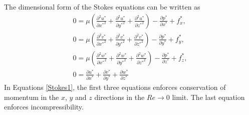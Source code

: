 \documentclass[10pt,a4paper]{article}
\def\non{\nonumber}
\def\p{\partial}
\begin{document}
The dimensional form of the Stokes equations can be written as
\begin{eqnarray}\label{Stokes1}
	0 = \mu \left( \frac{\p^2 u^*}{\p {x^*}^2}+\frac{\p^2 u^*}{\p {y^*}^2}+\frac{\p^2 u^*}{\p {z^*}^2} \right) - \frac{\p p^*}{\p {x^*}} + f_x^*, \non \\
	0 = \mu \left( \frac{\p^2 v^*}{\p {x^*}^2}+\frac{\p^2 v^*}{\p {y^*}^2}+\frac{\p^2 v^*}{\p {z^*}^2} \right) - \frac{\p p^*}{\p {y^*}} + f_y^*, \non \\
	0 = \mu \left( \frac{\p^2 w^*}{\p {x^*}^2}+\frac{\p^2 w^*}{\p {y^*}^2}+\frac{\p^2 w^*}{\p {z^*}^2} \right) - \frac{\p p^*}{\p {z^*}} + f_z^*, \non \\
	0 =  \frac{\p u^*}{\p {x^*}}+\frac{\p v^*}{\p {y^*}}+\frac{\p w^*}{\p {z^*}} 
\end{eqnarray}
In Equations \ref{Stokes1}, the first three equations enforces conservation of momentum in the $x$, $y$ and $z$ directions in the $Re \rightarrow 0$ limit.
The last equation enforces incompressibility.
\end{document}
